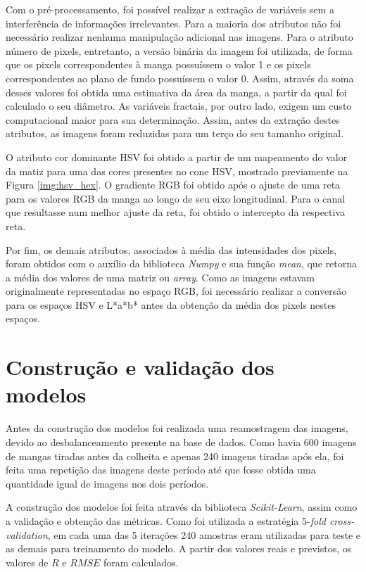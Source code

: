 Com o pré-processamento, foi possível realizar a extração de variáveis sem a interferência de informações irrelevantes. Para a maioria dos atributos não foi necessário realizar nenhuma manipulação adicional nas imagens. Para o atributo número de pixels, entretanto, a versão binária da imagem foi utilizada, de forma que os pixels correspondentes à manga possuíssem o valor 1 e os pixels correspondentes ao plano de fundo possuíssem o valor 0. Assim, através da soma desses valores foi obtida uma estimativa da área da manga, a partir da qual foi calculado o seu diâmetro. As variáveis fractais, por outro lado, exigem um custo computacional maior para sua determinação. Assim, antes da extração destes atributos, as imagens foram reduzidas para um terço do seu tamanho original.

O atributo cor dominante HSV foi obtido a partir de um mapeamento do valor da matiz para uma das cores presentes no cone HSV, mostrado previamente na Figura \ref{img:hsv_hex}. O gradiente RGB foi obtido após o ajuste de uma reta para os valores RGB da manga ao longo de seu eixo longitudinal. Para o canal que resultasse num melhor ajuste da reta, foi obtido o intercepto da respectiva reta. 

Por fim, os demais atributos, associados à média das intensidades dos pixels, foram obtidos com o auxílio da biblioteca \textit{Numpy} e sua função \textit{mean}, que retorna a média dos valores de uma matriz ou \textit{array}. Como as imagens estavam originalmente representadas no espaço RGB, foi necessário realizar a conversão para os espaços HSV e L*a*b* antes da obtenção da média dos pixels nestes espaços.

\section{Construção e validação dos modelos}

Antes da construção dos modelos foi realizada uma reamostragem das imagens, devido ao desbalanceamento presente na base de dados. Como havia 600 imagens de mangas tiradas antes da colheita e apenas 240 imagens tiradas após ela, foi feita uma repetição das imagens deste período até que fosse obtida uma quantidade igual de imagens nos dois períodos.

A construção dos modelos foi feita através da biblioteca \textit{Scikit-Learn}, assim como a validação e obtenção das métricas. Como foi utilizada a estratégia 5-\textit{fold cross-validation}, em cada uma das 5 iterações 240 amostras eram utilizadas para teste e as demais para treinamento do modelo. A partir dos valores reais e previstos, os valores de $R$ e $RMSE$ foram calculados.

